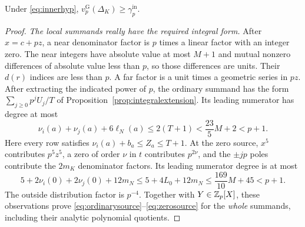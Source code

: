 \begin{proposition}
\label{prop:inner}
Under \eqref{eq:innerhyp},
$v_p^{\mathrm G}(\Delta_K)\ge\gamma_p^{\mathrm{in}}$.
\end{proposition}
\begin{proof}
\emph{The local summands really have the required integral form.}
After $x=c+pz$, a near denominator factor is $p$ times a linear factor
with an integer zero. The near integers have absolute value at most
$M+1$ and mutual nonzero differences of absolute value less than $p$,
so those differences are units. Their $d(r)$ indices are less than $p$.
A far factor is a unit times a geometric series in $pz$. After extracting
the indicated power of $p$, the ordinary summand has the form
$\sum_{j\ge0}p^jU_j/T$ of Proposition~\ref{prop:integralextension}.
Its leading numerator has degree at most
\[
 \nu_i(a)+\nu_j(a)+6\ell_N(a)\le2(T+1)<\frac{23}{5}M+2<p+1.
\]
Here every row satisfies $\nu_i(a)+b_a\le Z_a\le T+1$.
At the zero source, $x^5$ contributes $p^5z^5$, a zero of order $\nu$
in $t$ contributes $p^{2\nu}$, and the $\pm jp$ poles contribute the
$2m_K$ denominator factors. Its leading numerator degree is at most
\[
 5+2\nu_i(0)+2\nu_j(0)+12m_N
 \le5+4L_0+12m_N\le\frac{169}{10}M+45<p+1.
\]
The outside distribution factor is $p^{-4}$. Together with
$Y\in\mathbb Z_p[X]$, these observations prove
\eqref{eq:ordinarysource}--\eqref{eq:zerosource} for the \emph{whole}
summands, including their analytic polynomial quotients.


\end{proof}
